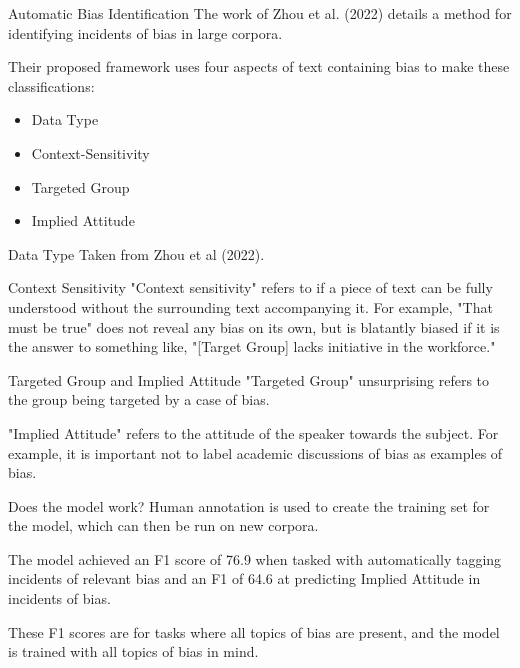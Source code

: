 \documentclass[10pt]{beamer}
\begin{document}
\begin{frame}{Automatic Bias Identification}
The work of Zhou et al. (2022) details a method for identifying incidents of bias in large corpora.

Their proposed framework uses four aspects of text containing bias to make these classifications:
\begin{itemize}
    \item Data Type
    \item Context-Sensitivity
    \item Targeted Group
    \item Implied Attitude
\end{itemize}
\end{frame}

\begin{frame}{Data Type}
Taken from Zhou et al (2022).
\end{frame}

\begin{frame}{Context Sensitivity}
"Context sensitivity" refers to if a piece of text can be fully understood without the surrounding text accompanying it. For example, "That must be true" does not reveal any bias on its own, but is blatantly biased if it is the answer to something like, "[Target Group] lacks initiative in the workforce."
\end{frame}

\begin{frame}{Targeted Group and Implied Attitude}
"Targeted Group" unsurprising refers to the group being targeted by a case of bias.

"Implied Attitude" refers to the attitude of the speaker towards the subject. For example, it is important not to label academic discussions of bias as examples of bias.
\end{frame}

\begin{frame}{Does the model work?}
Human annotation is used to create the training set for the model, which can then be run on new corpora.

The model achieved an F1 score of 76.9 when tasked with automatically tagging incidents of relevant bias and an F1 of 64.6 at predicting Implied Attitude in incidents of bias.

These F1 scores are for tasks where all topics of bias are present, and the model is trained with all topics of bias in mind.
\end{frame}
\end{document}
